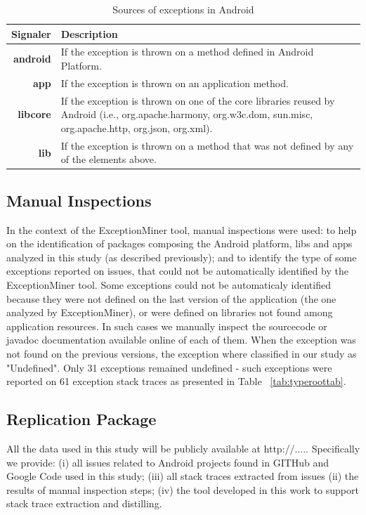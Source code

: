 \documentclass[conference]{IEEEtran}
\begin{document}

\begin{table}
  \centering
  \begin{tabular}{rp{29em}}
    \hline
    \bfseries{Signaler} & \bfseries{Description} \\
    \hline
    \bfseries{android} & If the exception is thrown on a method defined in Android Platform.\\
    \bfseries{app}     & If the exception is thrown on an application method.\\
    \bfseries{libcore} & If the exception is thrown on one of the core libraries reused by Android (i.e., org.apache.harmony, org.w3c.dom, sun.misc, org.apache.http, org.json, org.xml). \\
    \bfseries{lib}     & If the exception is thrown on a method that was not defined by any of the elements above.\\
    \hline
  \end{tabular}
  \caption{Sources of exceptions in Android}
  \label{tab:signalers}
\end{table}

\subsection{Manual Inspections}
In the context of the ExceptionMiner tool, manual inspections were used:
to help on the identification of packages composing the Android platform, 
libs and apps analyzed in this study (as described previously); and to 
identify the type of some exceptions reported on issues, 
that could not be automatically identified by the ExceptionMiner tool.
Some exceptions could not be automaticaly identified because they were 
not defined on the last version of the application (the one analyzed by ExceptionMiner),
or were defined on libraries not found among application resources.
In such cases we manually inspect the sourcecode or javadoc
 documentation available online of each of them. 
When the exception was not found on the previous versions, the exception where classified 
in our study as "Undefined".  Only 31 exceptions 
remained undefined - such exceptions were reported on 61 exception stack traces as 
presented in Table ~\ref{tab:typeroottab}.

\subsection{Replication Package}
All the data used in this study will be publicly available at http://.....
Specifically we provide: (i) all issues related to Android projects found
in GITHub and Google Code used in this study; (iii) all stack traces extracted
from issues (ii) the results of manual inspection steps; (iv) the tool developed 
in this work to support stack trace extraction and distilling.
\end{document}

